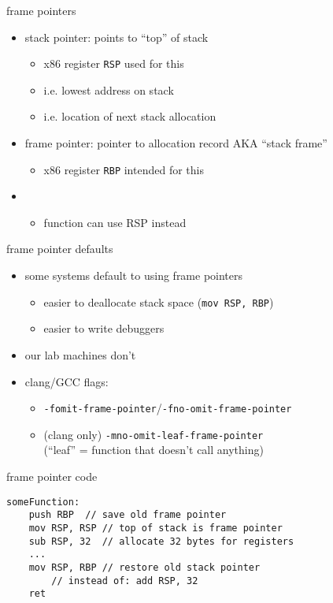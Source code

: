 \begin{frame}{frame pointers}
    \begin{itemize}
    \item stack pointer: points to ``top'' of stack
        \begin{itemize}
        \item x86 register \texttt{RSP} used for this
        \item i.e. lowest address on stack
        \item i.e. location of next stack allocation
        \end{itemize}
    \item frame pointer: pointer to allocation record AKA ``stack frame''
        \begin{itemize}
        \item x86 register \texttt{RBP} intended for this
        \end{itemize}
    \item {}
        \begin{itemize}
        \item function can use RSP instead
        \end{itemize}
    \end{itemize}
\end{frame}

\begin{frame}{frame pointer defaults}
    \begin{itemize}
    \item some systems default to using frame pointers
        \begin{itemize}
            \item easier to deallocate stack space ({\tt mov RSP, RBP})
        \item easier to write debuggers
        \end{itemize}
    \item our lab machines don't
    \item clang/GCC flags:
        \begin{itemize}
            \item {\tt-fomit-frame-pointer}/{\tt-fno-omit-frame-pointer}
            \item (clang only) {\tt-mno-omit-leaf-frame-pointer} \\
                (``leaf'' = function that doesn't call anything)
        \end{itemize}
    \end{itemize}
\end{frame}

\begin{frame}[fragile,label=framePointerCode]{frame pointer code}
    \lstset{language=myasm}
\begin{lstlisting}
someFunction:
    push RBP  // save old frame pointer
    mov RSP, RSP // top of stack is frame pointer
    sub RSP, 32  // allocate 32 bytes for registers
    ...
    mov RSP, RBP // restore old stack pointer
        // instead of: add RSP, 32
    ret
\end{lstlisting}
\end{frame}
